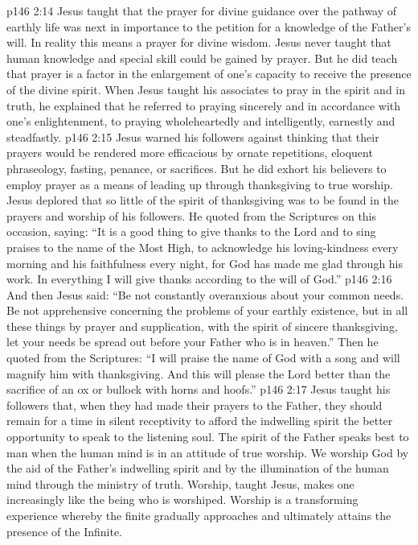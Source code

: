 \vs p146 2:14 \pc {}\bibnobreakspace Jesus taught that the prayer for divine guidance over the pathway of earthly life was next in importance to the petition for a knowledge of the Father’s will. In reality this means a prayer for divine wisdom. Jesus never taught that human knowledge and special skill could be gained by prayer. But he did teach that prayer is a factor in the enlargement of one’s capacity to receive the presence of the divine spirit. When Jesus taught his associates to pray in the spirit and in truth, he explained that he referred to praying sincerely and in accordance with one’s enlightenment, to praying wholeheartedly and intelligently, earnestly and steadfastly.
\vs p146 2:15 \pc {}\bibnobreakspace Jesus warned his followers against thinking that their prayers would be rendered more efficacious by ornate repetitions, eloquent phraseology, fasting, penance, or sacrifices. But he did exhort his believers to employ prayer as a means of leading up through thanksgiving to true worship. Jesus deplored that so little of the spirit of thanksgiving was to be found in the prayers and worship of his followers. He quoted from the Scriptures on this occasion, saying: \textcolor{ubdarkred}{“It is a good thing to give thanks to the Lord and to sing praises to the name of the Most High, to acknowledge his loving\hyp{}kindness every morning and his faithfulness every night, for God has made me glad through his work. In everything I will give thanks according to the will of God.”}
\vs p146 2:16 \pc {}\bibnobreakspace And then Jesus said: \textcolor{ubdarkred}{“Be not constantly overanxious about your common needs. Be not apprehensive concerning the problems of your earthly existence, but in all these things by prayer and supplication, with the spirit of sincere thanksgiving, let your needs be spread out before your Father who is in heaven.”} Then he quoted from the Scriptures: \textcolor{ubdarkred}{“I will praise the name of God with a song and will magnify him with thanksgiving. And this will please the Lord better than the sacrifice of an ox or bullock with horns and hoofs.”}
\vs p146 2:17 \pc {}\bibnobreakspace Jesus taught his followers that, when they had made their prayers to the Father, they should remain for a time in silent receptivity to afford the indwelling spirit the better opportunity to speak to the listening soul. The spirit of the Father speaks best to man when the human mind is in an attitude of true worship. We worship God by the aid of the Father’s indwelling spirit and by the illumination of the human mind through the ministry of truth. Worship, taught Jesus, makes one increasingly like the being who is worshiped. Worship is a transforming experience whereby the finite gradually approaches and ultimately attains the presence of the Infinite.
